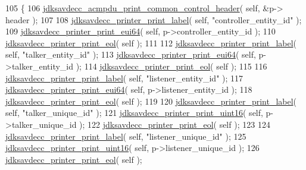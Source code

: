 \begin{DoxyCode}
105 \{
106     \hyperlink{group__acmp__print_ga59ff2d8effe67485e7e29789dc92627e}{jdksavdecc\_acmpdu\_print\_common\_control\_header}( \textcolor{keyword}{self}, &p->
      header );
107 
108     \hyperlink{group__util_gaf7818b24143b3c7502926a425a242ff5}{jdksavdecc\_printer\_print\_label}( \textcolor{keyword}{self}, \textcolor{stringliteral}{"controller\_entity\_id"} );
109     \hyperlink{group__util_gafdf65e002e889f4fc89db5d1e532eaa3}{jdksavdecc\_printer\_print\_eui64}( \textcolor{keyword}{self}, p->controller\_entity\_id );
110     \hyperlink{group__util_gacda56c9d3d24593a52c999682fa6e6e3}{jdksavdecc\_printer\_print\_eol}( \textcolor{keyword}{self} );
111 
112     \hyperlink{group__util_gaf7818b24143b3c7502926a425a242ff5}{jdksavdecc\_printer\_print\_label}( \textcolor{keyword}{self}, \textcolor{stringliteral}{"talker\_entity\_id"} );
113     \hyperlink{group__util_gafdf65e002e889f4fc89db5d1e532eaa3}{jdksavdecc\_printer\_print\_eui64}( \textcolor{keyword}{self}, p->talker\_entity\_id );
114     \hyperlink{group__util_gacda56c9d3d24593a52c999682fa6e6e3}{jdksavdecc\_printer\_print\_eol}( \textcolor{keyword}{self} );
115 
116     \hyperlink{group__util_gaf7818b24143b3c7502926a425a242ff5}{jdksavdecc\_printer\_print\_label}( \textcolor{keyword}{self}, \textcolor{stringliteral}{"listener\_entity\_id"} );
117     \hyperlink{group__util_gafdf65e002e889f4fc89db5d1e532eaa3}{jdksavdecc\_printer\_print\_eui64}( \textcolor{keyword}{self}, p->listener\_entity\_id );
118     \hyperlink{group__util_gacda56c9d3d24593a52c999682fa6e6e3}{jdksavdecc\_printer\_print\_eol}( \textcolor{keyword}{self} );
119 
120     \hyperlink{group__util_gaf7818b24143b3c7502926a425a242ff5}{jdksavdecc\_printer\_print\_label}( \textcolor{keyword}{self}, \textcolor{stringliteral}{"talker\_unique\_id"} );
121     \hyperlink{group__util_ga9793e0ff8e7ed25d957282ee6b257ce2}{jdksavdecc\_printer\_print\_uint16}( \textcolor{keyword}{self}, p->talker\_unique\_id );
122     \hyperlink{group__util_gacda56c9d3d24593a52c999682fa6e6e3}{jdksavdecc\_printer\_print\_eol}( \textcolor{keyword}{self} );
123 
124     \hyperlink{group__util_gaf7818b24143b3c7502926a425a242ff5}{jdksavdecc\_printer\_print\_label}( \textcolor{keyword}{self}, \textcolor{stringliteral}{"listener\_unique\_id"} );
125     \hyperlink{group__util_ga9793e0ff8e7ed25d957282ee6b257ce2}{jdksavdecc\_printer\_print\_uint16}( \textcolor{keyword}{self}, p->listener\_unique\_id );
126     \hyperlink{group__util_gacda56c9d3d24593a52c999682fa6e6e3}{jdksavdecc\_printer\_print\_eol}( \textcolor{keyword}{self} );

\end{DoxyCode}
